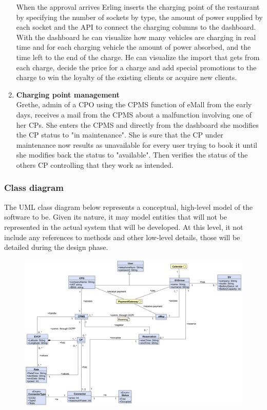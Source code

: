 \begin{enumerate}[label=\textbf{\Alph*}.]
            When the approval arrives Erling inserts the charging point of the restaurant by specifying the number of sockets by type, the amount of power supplied by
            each socket and the API to connect the charging columns to the dashboard. With the dashboard he can visualize how many vehicles are charging in real time
            and for each charging vehicle the amount of power absorbed, and the time left to the end of the charge. He can visualize the import that gets from each
            charge, decide the price for a charge and add special promotions to the charge to win the loyalty of the existing clients or acquire new clients.
      \item \textbf{Charging point management} \\
            Grethe, admin of a CPO using the CPMS function of eMall from the early days, receives a mail from the CPMS about a malfunction involving one of her CPs.
            She enters the CPMS and directly from the dashboard she modifies the CP status to "in maintenance".
            She is sure that the CP under maintenance now results as unavailable for every user trying to book it until she modifies back the status to "available".
            Then verifies the status of the others CP controlling that they work as intended.
\end{enumerate}

\subsubsection{Class diagram}
The UML class diagram below represents a conceptual, high-level model of
the software to be. Given its nature, it may model entities that will not
be represented in the actual system that will be developed. At this
level, it not include any references to methods and other low-level
details, those will be detailed during the design phase.
\begin{figure}[H]
      \centering
      \includegraphics[scale=0.4]{src/domain_UML.png}
\end{figure} \vspace{1cm}

